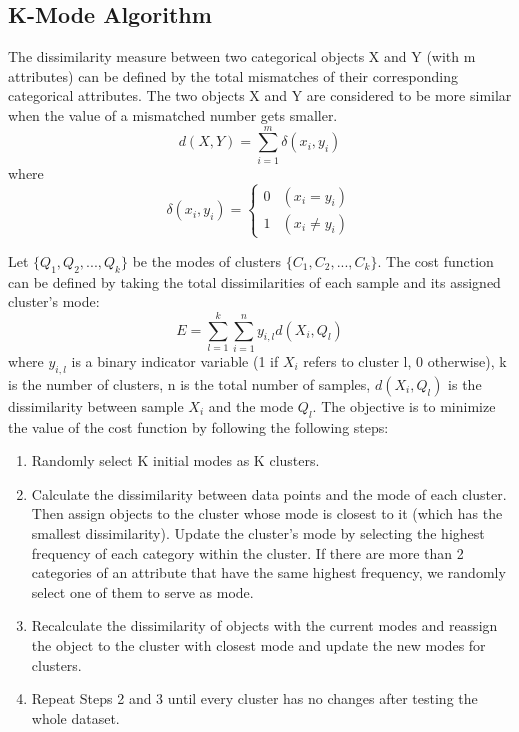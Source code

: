 \documentclass[12pt]{article}
\begin{document}
\subsection{K-Mode Algorithm}
The dissimilarity measure between two categorical objects X and Y (with m attributes) can be defined by the total mismatches of their corresponding categorical attributes. The two objects X and Y are considered to be more similar when the value of a mismatched number gets smaller.\citep{huang1998extensions}
        $$d(X,Y) = \sum_{i=1}^{m}\delta{(x_i,y_i)}$$ where $$\delta{(x_i,y_i)} = \left\{\begin{array}{ll} 0 & (x_i = y_i) \\
        1 & (x_i \neq y_i)\end{array}\right.$$

\vspace{0.5cm}

Let $\{Q_1,Q_2,...,Q_k\}$ be the modes of clusters $\{C_1,C_2,...,C_k\}$. The cost function can be defined by taking the total dissimilarities of each sample and its assigned cluster's mode\citep{huang1998extensions}: 
$$E = \sum_{l=1}^{k}\sum_{i=1}^{n}y_{i,l}d(X_i,Q_l)$$ 
where $y_{i,l}$ is a binary indicator variable (1 if $X_i$ refers to cluster l, 0 otherwise), k is the number of clusters, n is the total number of samples, $d(X_i,Q_l)$ is the dissimilarity between sample $X_i$ and the mode $Q_l$. The objective is to minimize the value of the cost function by following the following steps: 

\begin{enumerate}
    \item Randomly select K initial modes as K clusters.
    
    \item Calculate the dissimilarity between data points and the mode of each cluster. Then assign objects to the cluster whose mode is closest to it (which has the smallest dissimilarity). Update the cluster’s mode by selecting the highest frequency of each category within the cluster. If there are more than 2 categories of an attribute that have the same highest frequency, we randomly select one of them to serve as mode.
    
    \item Recalculate the dissimilarity of objects with the current modes and reassign the object to the cluster with closest mode and update the new modes for clusters.
    
    \item Repeat Steps 2 and 3 until every cluster has no changes after testing the whole dataset.
\end{enumerate}
\end{document}
